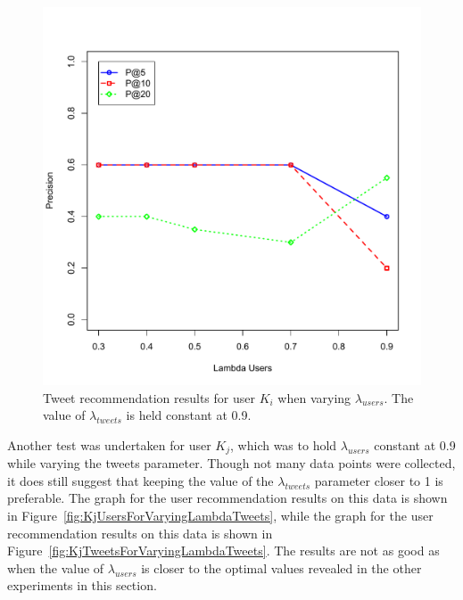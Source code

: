 \begin{figure}
  \centering
  \includegraphics[scale=0.75]{Ki_Varying_LambdaUsers_TweetResults}
  \caption[Tweet recommendation results for user $K_{i}$ when varying $\lambda_{users}$]{Tweet recommendation results for user $K_{i}$ when varying $\lambda_{users}$. The value of $\lambda_{tweets}$ is held constant at 0.9.}
  \label{fig:TweetsForVaryingLambdaUsers}
\end{figure}


Another test was undertaken for user $K_{j}$, which was to hold $\lambda_{users}$ constant at 0.9 while varying the tweets parameter. Though not many data points were collected, it does still suggest that keeping the value of the $\lambda_{tweets}$ parameter closer to 1 is preferable. The graph for the user recommendation results on this data is shown in Figure~\ref{fig:KjUsersForVaryingLambdaTweets}, while the graph for the user recommendation results on this data is shown in Figure~\ref{fig:KjTweetsForVaryingLambdaTweets}. The results are not as good as when the value of $\lambda_{users}$ is closer to the optimal values revealed in the other experiments in this section.

